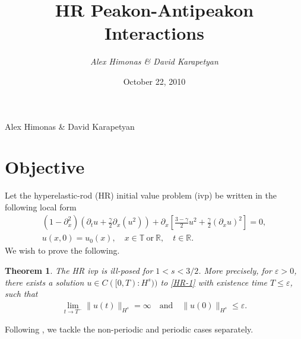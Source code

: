 \documentclass[12pt,reqno]{amsart}
\numberwithin{equation}{section}  %
\numberwithin{figure}{section}
\newcommand{\rr}{\mathbb{R}}
\newcommand{\p}{\partial}
\newcommand{\ci}{\mathbb{T}}
\newcommand{\ee}{\varepsilon}
\theoremstyle{plain}  %
\newtheorem{theorem}{Theorem}
\theoremstyle{definition}
\begin{document}


  \title{ HR Peakon-Antipeakon Interactions}

  \author{{\it Alex Himonas \& David Karapetyan}}




  \date{October 22, 2010}




  \maketitle
  {Alex  Himonas    \& David Karapetyan}


  \parindent0in
  \parskip0.1in




%
%



\section{Objective}
%
%
Let the hyperelastic-rod (HR) initial value problem (ivp) be written in the following local form
%
%
%
\begin{gather}
  \label{HR-1}
  \left( 1- \p_x^2 \right)\left( \p_t u + \frac{\gamma}{2} \p_x(u^2) \right) +
  \p_x\left[ \frac{3-\gamma}{2}u^{2}  + \frac{\gamma}{2}  \left( \p_x u  \right)^2\right] = 0,
  \\
  \label{hr-eq-init-data}
  u(x,0) = u_0(x), \quad x \in \ci \ \text{or} \ \rr, \quad t \in \rr.
\end{gather}
%
%
%
%
We wish to prove the following.
%
%
%
%
%
%
%
%
\begin{theorem}
  The HR ivp is ill-posed for $1 < s < 3/2$. More precisely, for $\ee >0$, there
  exists a solution $u \in C([0, T): H^s))$ to \eqref{HR-1}
  with existence time $T \le \ee$, such that
  \begin{equation*}
    \begin{split}
      \lim_{t \to T^{-}} \|u(t)\|_{H^s} = \infty \quad \text{and} \quad
      \|u(0)\|_{H^s} \le \ee.
    \end{split}
  \end{equation*}
\end{theorem}
Following \cite{Byers-2006-Existence-time-for-the-Camassa-Holm}, we tackle the
non-periodic and periodic cases separately.
%
%
%
%
%
%
%
%
\end{document}
